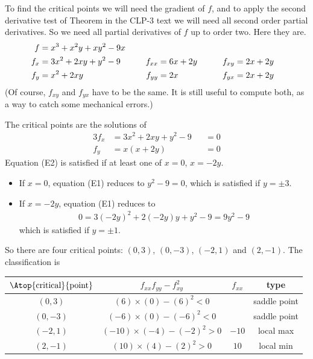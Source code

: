 \begin{solution}
To find the critical points we will need the
gradient of $f$, and to apply the second derivative test of 
Theorem  in the CLP-3 text 
we will need all 
second order partial derivatives. So we need all partial derivatives of
$f$ up to order two.
Here they are.
\begin{alignat*}{3}
f&=x^3 + x^2y + xy^2 - 9x \hidewidth\\
f_x&=3x^2+2xy+y^2-9 \qquad   & f_{xx}&=6x+2y \qquad & f_{xy}&= 2x+2y\\
f_y&=x^2+2xy  & f_{yy}&=2x\qquad & f_{yx}&= 2x+2y
\end{alignat*}
(Of course, $f_{xy}$ and $f_{yx}$ have to be the same. It is still
useful to compute both, as a way to catch some mechanical errors.)

The critical points are the solutions of
\begin{alignat*}{3}
f_x&=3x^2+2xy+y^2-9&&=0  \tag{E1} \\
f_y&=x(x+2y) &&= 0  \tag{E2}
\end{alignat*}
Equation (E2) is satisfied if at least one of $x=0$, $x=-2y$.
\begin{itemize}
\item If $x=0$, equation (E1) reduces to $y^2-9=0$,
which is satisfied if $y=\pm 3$.

\item If $x=-2y$, equation (E1) reduces to 
\begin{align*}
0=3(-2y)^2+2(-2y)y+y^2-9=9y^2-9
\end{align*}
which is satisfied if $y=\pm 1$.

\end{itemize}

So there are four critical points: $(0,3)$, $(0,-3)$, $(-2,1)$ and $(2,-1)$.
The classification is
\begin{center}
\renewcommand{\arraystretch}{1.3}
     \begin{tabular}{|c|c|c|c|}
     \hline
    $\Atop{\text{critical}}{\text{point}}$  & $f_{xx}f_{yy}-f_{xy}^2$ & 
                                                          $f_{xx}$ & type \\    
    \hline
     $(0,3)$  & 
           $(6)\times (0)-(6)^2< 0$ &   & 
                                                saddle point  \\ \hline
     $(0,-3)$  & 
       $(-6)\times (0)-(-6)^2<0$ &  & 
                                                saddle point \\  \hline
     $(-2,1)$  & 
       $(-10)\times (-4)-(-2)^2>0$ &  $-10$ & 
                                                local max \\  \hline
     $(2,-1)$  & 
       $(10)\times (4)-(2)^2>0$   & $10$ & 
                                                local min \\  \hline
     \end{tabular}
\renewcommand{\arraystretch}{1.0}
\end{center}
\end{solution}


